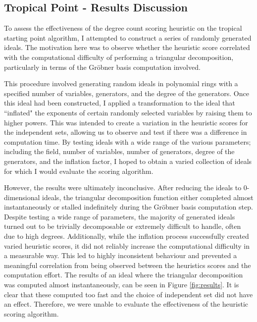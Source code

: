 \documentclass[11pt,reqno,a4paper]{article}
\theoremstyle{theoremstyle}
\theoremstyle{examplestyle}
\theoremstyle{algorithmstyle}
\numberwithin{equation}{subsection}
\begin{document}
\subsection{Tropical Point - Results Discussion}

To assess the effectiveness of the degree count scoring heuristic on the tropical starting point algorithm, I attempted to construct a series of randomly generated ideals. The motivation here was to observe whether the heuristic score correlated with the computational difficulty of performing a triangular decomposition, particularly in terms of the Gröbner basis computation involved.

This procedure involved generating random ideals in polynomial rings with a specified number of variables, generators, and the degree of the generators. Once this ideal had been constructed, I applied a transformation to the ideal that ``inflated" the exponents of certain randomly selected variables by raising them to higher powers. This was intended to create a variation in the heuristic scores for the independent sets, allowing us to observe and test if there was a difference in computation time. By testing ideals with a wide range of the various parameters; including the field, number of variables, number of generators, degree of the generators, and the inflation factor, I hoped to obtain a varied collection of ideals for which I would evaluate the scoring algorithm.

However, the results were ultimately inconclusive. After reducing the ideals to 0-dimensional ideals, the triangular decomposition function either completed almost instantaneously or stalled indefinitely during the Gröbner basis computation step. Despite testing a wide range of parameters, the majority of generated ideals turned out to be trivially decomposable or extremely difficult to handle, often due to high degrees. Additionally, while the inflation process successfully created varied heuristic scores, it did not reliably increase the computational difficulty in a measurable way. This led to highly inconsistent behaviour and prevented a meaningful correlation from being observed between the heuristics scores and the computation effort. The results of an ideal where the triangular decomposition was computed almost instantaneously, can be seen in Figure \ref{fig:results}. It is clear that these computed too fast and the choice of independent set did not have an effect. Therefore, we were unable to evaluate the effectiveness of the heuristic scoring algorithm.
\end{document}
